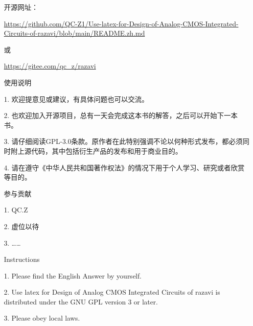 


开源网址：

\url{https://github.com/QC-Z1/Use-latex-for-Design-of-Analog-CMOS-Integrated-Circuits-of-razavi/blob/main/README.zh.md}

或

\url{https://gitee.com/qc_z/razavi}


 使用说明

1.  欢迎提意见或建议，有具体问题也可以交流。

2.  也欢迎加入开源项目，总有一天会完成这本书的解答，之后可以开始下一本书。

3.  请仔细阅读GPL-3.0条款。原作者在此特别强调不论以何种形式发布，都必须同时附上源代码，其中包括衍生产品的发布和用于商业目的。

4.  请在遵守《中华人民共和国著作权法》的情况下用于个人学习、研究或者欣赏等目的。

 参与贡献

1.  QC.Z

2.  虚位以待

3.  ……

 Instructions

1.  Please find the English Answer by yourself.

2.  Use latex for Design of Analog CMOS Integrated Circuits of razavi is distributed under the GNU GPL version 3 or later.

3.  Please obey local laws.